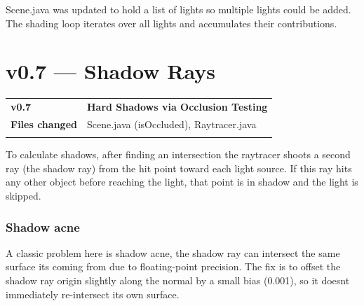 \documentclass[
]{article}
\newcounter{none} %
\begin{document}
Scene.java was updated to hold a list of lights so multiple lights could
be added. The shading loop iterates over all lights and accumulates
their contributions.

\section{\texorpdfstring{\textbf{v0.7 --- Shadow
Rays}}{v0.7 --- Shadow Rays}}\label{v0.7-shadow-rays}

{\def\LTcaptype{none} %
\begin{longtable}[]{@{}
  >{\raggedright\arraybackslash}p{}
  >{\raggedright\arraybackslash}p{}@{}}
\toprule\noalign{}
\begin{minipage}[b]{\linewidth}\raggedright
\textbf{v0.7}
\end{minipage} & \begin{minipage}[b]{\linewidth}\raggedright
\textbf{Hard Shadows via Occlusion Testing}
\end{minipage} \\
\begin{minipage}[b]{\linewidth}\raggedright
\textbf{Files changed}
\end{minipage} & \begin{minipage}[b]{\linewidth}\raggedright
Scene.java (isOccluded), Raytracer.java
\end{minipage} \\
\midrule\noalign{}
\endhead
\bottomrule\noalign{}
\endlastfoot
\end{longtable}
}

To calculate shadows, after finding an intersection the raytracer shoots
a second ray (the shadow ray) from the hit point toward each light
source. If this ray hits any other object before reaching the light,
that point is in shadow and the light is skipped.

\subsubsection{\texorpdfstring{\textbf{Shadow
acne}}{Shadow acne}}\label{shadow-acne}

A classic problem here is shadow acne, the shadow ray can intersect the
same surface it\textquotesingle s coming from due to floating-point
precision. The fix is to offset the shadow ray origin slightly along the
normal by a small bias (0.001), so it doesn\textquotesingle t
immediately re-intersect its own surface.
\end{document}
